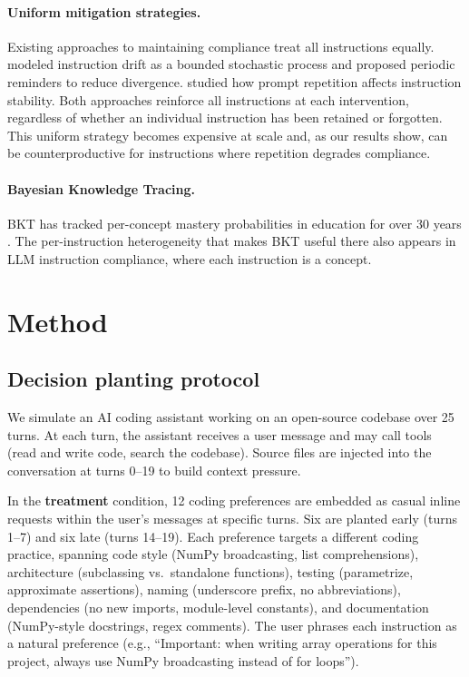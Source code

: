 \documentclass[a4paper]{llncs}
\begin{document}
\paragraph{Uniform mitigation strategies.}
Existing approaches to maintaining compliance treat all instructions
equally. \textcite{dongre2025} modeled instruction drift as a bounded
stochastic process and proposed periodic reminders to reduce divergence.
\textcite{leviathan2025} studied how prompt repetition affects
instruction stability. Both approaches reinforce all instructions at
each intervention, regardless of whether an individual instruction has
been retained or forgotten. This uniform strategy becomes expensive at
scale and, as our results show, can be counterproductive for
instructions where repetition degrades compliance.

\paragraph{Bayesian Knowledge Tracing.}
BKT has tracked per-concept mastery probabilities in education for over
30 years \parencite{corbett1994}. The
per-instruction heterogeneity that makes BKT useful there also appears in
LLM instruction compliance, where each instruction is a concept.


\section{Method}
\label{sec:method}

\subsection{Decision planting protocol}
\label{sec:planting}

We simulate an AI coding assistant working on an open-source
codebase over 25 turns. At each turn, the assistant receives a user
message and may call tools (read and write code, search the
codebase). Source files are injected into the conversation at
turns 0--19 to build context pressure.

In the \textbf{treatment} condition, 12 coding preferences are embedded
as casual inline requests within the user's messages at specific turns.
Six are planted early (turns 1--7) and six late (turns 14--19). Each
preference targets a different coding practice, spanning code style (NumPy
broadcasting, list comprehensions), architecture (subclassing vs.\ standalone
functions), testing (parametrize, approximate assertions),
naming (underscore prefix, no abbreviations), dependencies (no new
imports, module-level constants), and documentation (NumPy-style
docstrings, regex comments). The user phrases each instruction as a natural
preference (e.g., ``Important: when
writing array operations for this project, always use NumPy
broadcasting instead of for loops'').
\end{document}
